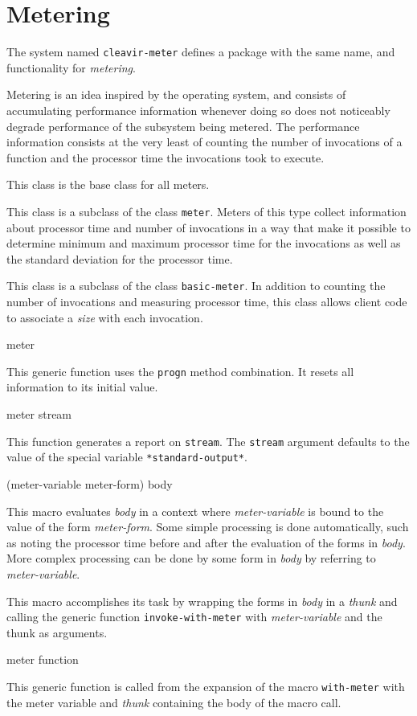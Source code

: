 \chapter{Metering}

The system named \texttt{cleavir-meter} defines a package with the
same name, and functionality for \emph{metering}. 

Metering is an idea inspired by the \multics{} operating system, and
consists of accumulating performance information whenever doing so
does not noticeably degrade performance of the subsystem being
metered.  The performance information consists at the very least of
counting the number of invocations of a function and the processor
time the invocations took to execute.


This class is the base class for all meters.


This class is a subclass of the class \texttt{meter}.  Meters of this
type collect information about processor time and number of
invocations in a way that make it possible to determine minimum and
maximum processor time for the invocations as well as the standard
deviation for the processor time.


This class is a subclass of the class \texttt{basic-meter}.  In
addition to counting the number of invocations and measuring processor
time, this class allows client code to associate a \emph{size} with
each invocation.

 {meter}

This generic function uses the \texttt{progn} method combination.  It
resets all information to its initial value.

 {meter \optional{} stream}

This function generates a report on \texttt{stream}.
The \texttt{stream} argument defaults to the value of the special
variable \texttt{*standard-output*}.

 {(meter-variable meter-form) \body{} body}

This macro evaluates \textit{body} in a context where
\textit{meter-variable} is bound to the value of the form
\textit{meter-form}.  Some simple processing is done automatically,
such as noting the processor time before and after the evaluation of
the forms in \textit{body}.  More complex processing can be done by
some form in \textit{body} by referring to \textit{meter-variable}.

This macro accomplishes its task by wrapping the forms in
\textit{body} in a \emph{thunk} and calling the generic function
\texttt{invoke-with-meter} with \textit{meter-variable} and the thunk
as arguments.

 {meter function}

This generic function is called from the expansion of the macro
\texttt{with-meter} with the meter variable and  \emph{thunk}
containing the body of the macro call.
